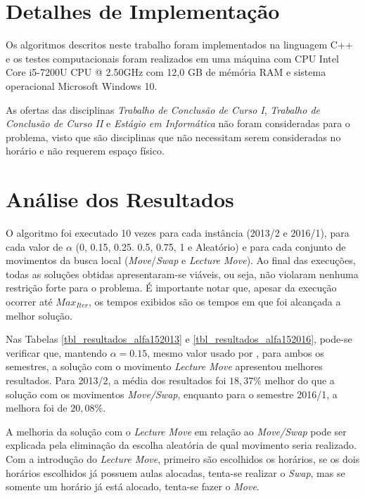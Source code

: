 \section{Detalhes de Implementação}
\label{sec-res-impl}

Os algoritmos descritos neste trabalho foram implementados na linguagem C++ e os testes computacionais foram realizados em uma máquina com CPU Intel Core i5-7200U CPU @ 2.50GHz com 12,0 GB de mémória RAM e sistema operacional Microsoft Windows 10.

As ofertas das disciplinas \textit{Trabalho de Conclusão de Curso I}, \textit{Trabalho de Conclusão de Curso II} e \textit{Estágio em Informática} não foram consideradas para o problema, visto que são disciplinas que não necessitam serem consideradas no horário e não requerem espaço físico.

\section{Análise dos Resultados}
\label{sec-res-anal}

O algoritmo foi executado 10 vezes para cada instância (2013/2 e 2016/1), para cada valor de \(\alpha\) (0, 0.15, 0.25. 0.5, 0.75, 1 e Aleatório) e para cada conjunto de movimentos da busca local (\textit{Move}/\textit{Swap} e \textit{Lecture Move}). Ao final das execuções, todas as soluções obtidas apresentaram-se viáveis, ou seja, não violaram nenhuma restrição forte para o problema. É importante notar que, apesar da execução ocorrer até \(Max_{Iter}\), os tempos exibidos são os tempos em que foi alcançada a melhor solução.

Nas Tabelas \ref{tbl_resultados_alfa152013} e \ref{tbl_resultados_alfa152016}, pode-se verificar que, mantendo \(\alpha = 0.15\), mesmo valor usado por , para ambos os semestres, a solução com o movimento \textit{Lecture Move} apresentou melhores resultados. Para 2013/2, a média dos resultados foi \(18,37\%\) melhor do que a solução com os movimentos \textit{Move/Swap}, enquanto para o semestre 2016/1, a melhora foi de \(20,08\%\).

A melhoria da solução com o \textit{Lecture Move} em relação ao  \textit{Move/Swap} pode ser explicada pela eliminação da escolha aleatória de qual movimento seria realizado. Com a introdução do \textit{Lecture Move}, primeiro são escolhidos os horários, se os dois horários escolhidos já possuem aulas alocadas, tenta-se realizar o \textit{Swap}, mas se somente um horário já está alocado, tenta-se fazer o \textit{Move}.

